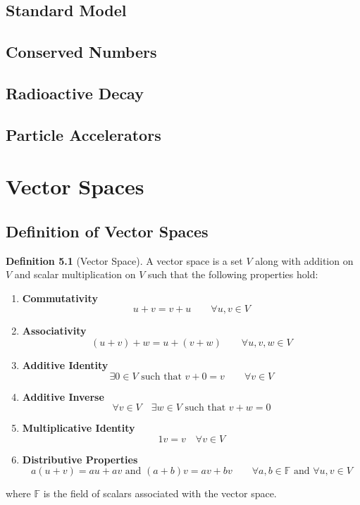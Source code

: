 \documentclass[oneside]{book}
\numberwithin{figure}{section}
\numberwithin{equation}{section}
\theoremstyle{definition}
\newtheorem{definition}{Definition}[section]
\begin{document}
	\section{Standard Model}
	\section{Conserved Numbers}
	\section{Radioactive Decay}
	\section{Particle Accelerators}

	\appendix
	\chapter{Vector Spaces}
	\section{Definition of Vector Spaces}
	\begin{definition}[Vector Space]
		A vector space is a set $ V $ along with addition on $ V $ and scalar multiplication on $ V $ such that the following properties hold:
		\begin{enumerate}[label=\roman*.]
			\item \textbf{Commutativity}
			\[ u + v = v + u \qquad \forall u,v \in V \]
			
			\item \textbf{Associativity}
			\[ (u + v) + w = u + (v + w) \qquad \forall u,v,w \in V \]
			
			\item \textbf{Additive Identity}
			\[ \exists 0 \in V \text{ such that } v + 0 = v \qquad \forall v \in V \]
			
			\item \textbf{Additive Inverse}
			\[ \forall v \in V \quad \exists w \in V \text{ such that } v + w = 0  \]
			
			\item \textbf{Multiplicative Identity}
			\[ 1v = v \quad \forall v \in V \]
			
			\item \textbf{Distributive Properties}
			\[ a(u + v) = au + av \text{ and } (a + b)v = av + bv \qquad \forall a,b \in \mathbb{F} \text{ and } \forall u,v \in V \]
		\end{enumerate}
		where $ \mathbb{F} $ is the field of scalars associated with the vector space.
	\end{definition}
\end{document}
